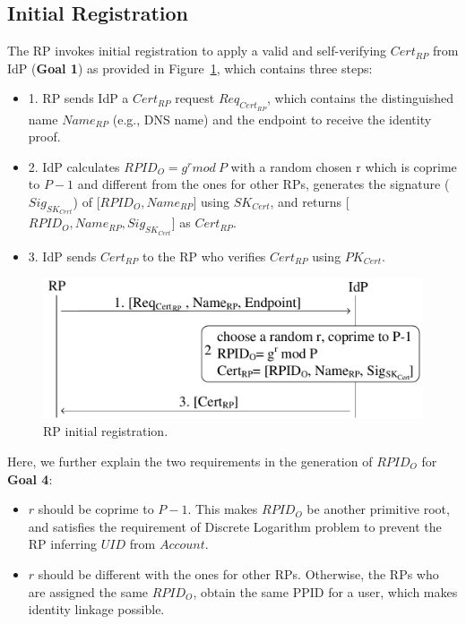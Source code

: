 \subsection{Initial Registration}
\label{subsec:intialreg}
The RP invokes initial registration to apply a valid and self-verifying $Cert_{RP}$ from IdP (\textbf{Goal 1}) as provided in Figure~\ref{fig:registration}, which contains three steps:
\begin{itemize}
\item 1. RP sends IdP a $Cert_{RP}$ request $Req_{Cert_{RP}}$, which contains the distinguished name $Name_{RP}$ (e.g., DNS name) and the endpoint to receive the identity proof.
\item 2. IdP calculates $RPID_O = g^r mod \ P$ with a random chosen r which is coprime to $P-1$ and different from the ones for other RPs,  generates the signature ($Sig_{SK_{Cert}}$) of [$RPID_O, Name_{RP}$] using $SK_{Cert}$, and returns [$RPID_O, Name_{RP}, Sig_{SK_{Cert}}$] as $Cert_{RP}$.
\item 3. IdP sends $Cert_{RP}$ to the RP who verifies $Cert_{RP}$ using $PK_{Cert}$.
\end{itemize}

\begin{figure}
  \centering
  \includegraphics[width=\linewidth]{fig/registration.pdf}
  \caption{RP initial registration.}
  \label{fig:registration}
\end{figure}

Here, we further explain the two requirements in the generation of $RPID_O$ for \textbf{Goal 4}:
\begin{itemize}
  \item $r$ should be coprime to $P-1$. This makes $RPID_O$ be another primitive root, and satisfies the requirement of Discrete Logarithm problem to prevent the RP  inferring $UID$ from $Account$.
  \item $r$ should be different with the ones for other RPs. Otherwise, the RPs who are assigned the same $RPID_O$, obtain the same PPID for a user, which makes identity linkage possible.
\end{itemize}

